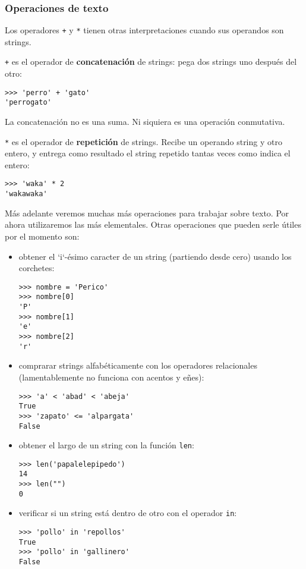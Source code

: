 \subsubsection{Operaciones de texto}

Los operadores \lstinline!+! y \lstinline!*! tienen otras
interpretaciones cuando sus operandos son strings.

\lstinline!+! es el operador de \textbf{concatenación} de strings: pega
dos strings uno después del otro:

\begin{lstlisting}
>>> 'perro' + 'gato'
'perrogato'
\end{lstlisting}

La concatenación no es una suma. Ni siquiera es una operación
conmutativa.

\lstinline!*! es el operador de \textbf{repetición} de strings. Recibe
un operando string y otro entero, y entrega como resultado el string
repetido tantas veces como indica el entero:

\begin{lstlisting}
>>> 'waka' * 2
'wakawaka'
\end{lstlisting}

Más adelante veremos muchas más operaciones para trabajar sobre texto.
Por ahora utilizaremos las más elementales. Otras operaciones que pueden
serle útiles por el momento son:

\begin{itemize}
\item
  obtener el `i`-ésimo caracter de un string (partiendo desde cero)
  usando los corchetes:

\begin{lstlisting}
>>> nombre = 'Perico'
>>> nombre[0]
'P'
>>> nombre[1]
'e'
>>> nombre[2]
'r'
\end{lstlisting}
\item
  comprarar strings alfabéticamente con los operadores relacionales
  (lamentablemente no funciona con acentos y eñes):

\begin{lstlisting}
>>> 'a' < 'abad' < 'abeja'
True
>>> 'zapato' <= 'alpargata'
False
\end{lstlisting}
\item
  obtener el largo de un string con la función \lstinline!len!:

\begin{lstlisting}
>>> len('papalelepipedo')
14
>>> len("")
0
\end{lstlisting}
\item
  verificar si un string está dentro de otro con el operador
  \lstinline!in!:

\begin{lstlisting}
>>> 'pollo' in 'repollos'
True
>>> 'pollo' in 'gallinero'
False
\end{lstlisting}
\end{itemize}

